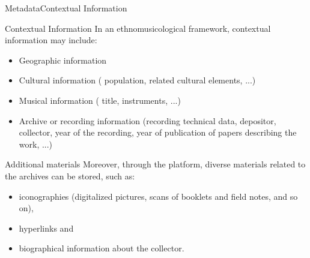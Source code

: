\documentclass[final, hyperref, table]{beamer}
\begin{document}
\begin{frame}[label=telemeta_metadata]{Metadata}{Contextual Information}
\scriptsize
\begin{block}{Contextual Information}
  In an ethnomusicological framework, contextual information
  may include:
  \begin{itemize}
  \item Geographic information
  \item Cultural information ( population, related cultural elements, ...)
  \item Musical information ( title, instruments, ...)
  \item Archive or recording information (recording technical data, depositor, collector, year of the recording, year of publication of
    papers describing the work, ...)
  \end{itemize}
  
\end{block}

\begin{block}{Additional materials}
  Moreover, through the platform, diverse materials related to the
  archives can be stored, such as:
  \begin{itemize}
  \item iconographies (digitalized pictures, scans of booklets and
    field notes, and so on),
  \item hyperlinks and
  \item biographical information about the collector.
  \end{itemize}
\end{block}
\end{frame}


\end{document}
